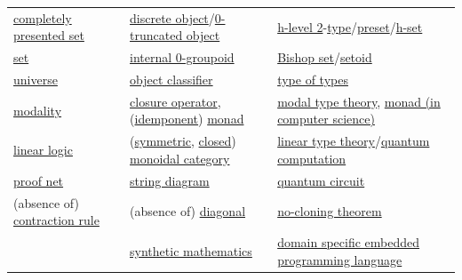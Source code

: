 \documentclass[11pt]{article}
\begin{document}
\begin{longtable}{lll}
\href{https://ncatlab.org/nlab/show/completely+presented+set}{completely presented set} & \href{https://ncatlab.org/nlab/show/discrete+object}{discrete object}/\href{https://ncatlab.org/nlab/show/0-truncated+object}{0-truncated object} & \href{https://ncatlab.org/nlab/show/h-level+2}{h-level 2}-\href{https://ncatlab.org/nlab/show/type}{type}/\href{https://ncatlab.org/nlab/show/preset}{preset}/\href{https://ncatlab.org/nlab/show/h-set}{h-set}\\
\href{https://ncatlab.org/nlab/show/set}{set} & \href{https://ncatlab.org/nlab/show/groupoid+object+in+an+\%28infinity\%2C1\%29-category}{internal 0-groupoid} & \href{https://ncatlab.org/nlab/show/Bishop+set}{Bishop set}/\href{https://ncatlab.org/nlab/show/setoid}{setoid}\\
\href{https://ncatlab.org/nlab/show/universe}{universe} & \href{https://ncatlab.org/nlab/show/object+classifier}{object classifier} & \href{https://ncatlab.org/nlab/show/type+of+types}{type of types}\\
\href{https://ncatlab.org/nlab/show/modality}{modality} & \href{https://ncatlab.org/nlab/show/closure+operator}{closure operator}, (\href{https://ncatlab.org/nlab/show/idempotent+monad}{idemponent}) \href{https://ncatlab.org/nlab/show/monad}{monad} & \href{https://ncatlab.org/nlab/show/modal+type+theory}{modal type theory}, \href{https://ncatlab.org/nlab/show/monad+\%28in+computer+science\%29}{monad (in computer science)}\\
\href{https://ncatlab.org/nlab/show/linear+logic}{linear logic} & (\href{https://ncatlab.org/nlab/show/symmetric+monoidal+category}{symmetric}, \href{https://ncatlab.org/nlab/show/closed+monoidal+category}{closed}) \href{https://ncatlab.org/nlab/show/monoidal+category}{monoidal category} & \href{https://ncatlab.org/nlab/show/linear+type+theory}{linear type theory}/\href{https://ncatlab.org/nlab/show/quantum+computation}{quantum computation}\\
\href{https://ncatlab.org/nlab/show/proof+net}{proof net} & \href{https://ncatlab.org/nlab/show/string+diagram}{string diagram} & \href{https://ncatlab.org/nlab/show/quantum+circuit}{quantum circuit}\\
(absence of) \href{https://ncatlab.org/nlab/show/contraction+rule}{contraction rule} & (absence of) \href{https://ncatlab.org/nlab/show/diagonal}{diagonal} & \href{https://ncatlab.org/nlab/show/no-cloning+theorem}{no-cloning theorem}\\
 & \href{https://ncatlab.org/nlab/show/synthetic+mathematics}{synthetic mathematics} & \href{https://ncatlab.org/nlab/show/domain+specific+embedded+programming+language}{domain specific embedded programming language}\\
\end{longtable}
\end{document}
